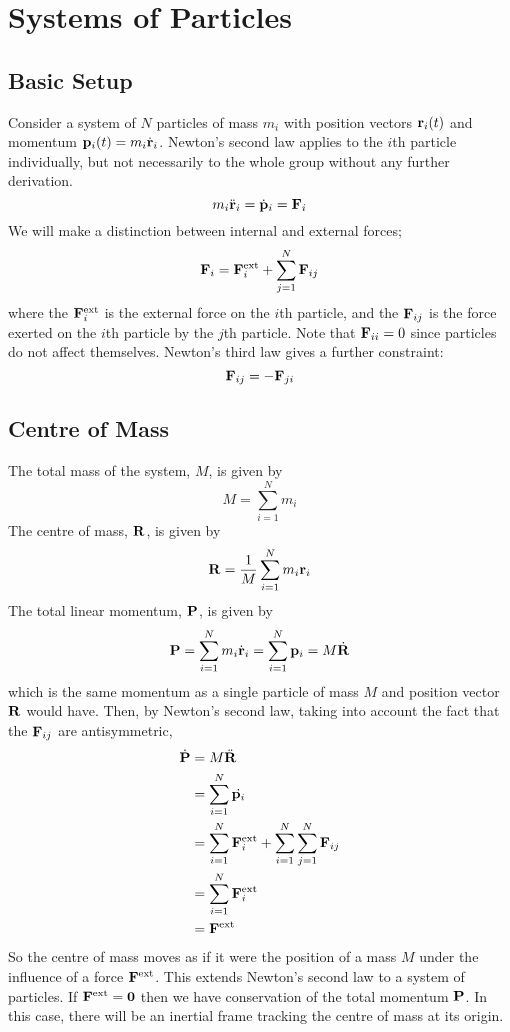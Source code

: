 \documentclass{article}
\begin{document}
\section{Systems of Particles}
\subsection{Basic Setup}
Consider a system of $N$ particles of mass $m_i$ with position vectors $\vb r_i(t)$ and momentum $\vb p_i(t) = m_i \dot {\vb r}_i$. Newton's second law applies to the $i$th particle individually, but not necessarily to the whole group without any further derivation.
\[ m_i \ddot{\vb r}_i = \dot{\vb p}_i = \vb F_i \]
We will make a distinction between internal and external forces;
\[ \vb F_i = \vb F_i^\text{ext} + \sum_{j = 1}^N \vb F_{ij} \]
where the $\vb F_i^\text{ext}$ is the external force on the $i$th particle, and the $\vb F_{ij}$ is the force exerted on the $i$th particle by the $j$th particle. Note that $\vb F_{ii} = 0$ since particles do not affect themselves. Newton's third law gives a further constraint:
\[ \vb F_{ij} = -\vb F_{ji} \]

\subsection{Centre of Mass}
The total mass of the system, $M$, is given by
\[ M = \sum_{i=1}^N m_i \]
The centre of mass, $\vb R$, is given by
\[ \vb R = \frac{1}{M} \sum_{i=1}^N m_i \vb r_i \]
The total linear momentum, $\vb P$, is given by
\[ \vb P = \sum_{i=1}^N m_i \dot{\vb r}_i = \sum_{i=1}^N \vb p_i = M\dot{\vb R} \]
which is the same momentum as a single particle of mass $M$ and position vector $\vb R$ would have. Then, by Newton's second law, taking into account the fact that the $\vb F_{ij}$ are antisymmetric,
\begin{align*}
	\dot{\vb P} & = M \ddot{\vb R}                                                         \\
	            & = \sum_{i=1}^N \dot{\vb p_i}                                             \\
	            & = \sum_{i=1}^N \vb F_i^\text{ext} + \sum_{i=1}^N \sum_{j=1}^N \vb F_{ij} \\
	            & = \sum_{i=1}^N \vb F_i^\text{ext}                                        \\
	            & = \vb F^\text{ext}
\end{align*}
So the centre of mass moves as if it were the position of a mass $M$ under the influence of a force $\vb F^\text{ext}$. This extends Newton's second law to a system of particles. If $\vb F^\text{ext} = \vb 0$ then we have conservation of the total momentum $\vb P$. In this case, there will be an inertial frame tracking the centre of mass at its origin.
\end{document}
